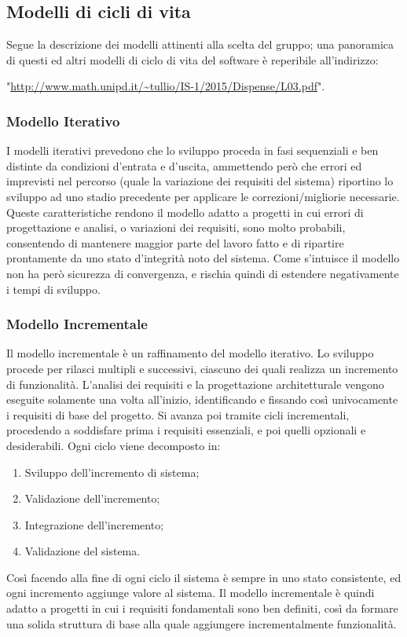\documentclass[a4paper,11pt]{article}
\begin{document}
	\subsection{Modelli di cicli di vita}
	Segue la descrizione dei modelli attinenti alla scelta del gruppo; una panoramica di questi ed altri modelli di ciclo di vita del software è reperibile all'indirizzo: 
	
	"\url{http://www.math.unipd.it/~tullio/IS-1/2015/Dispense/L03.pdf}".
	\subsubsection{Modello Iterativo}
	I modelli iterativi prevedono che lo sviluppo proceda in fasi sequenziali e ben distinte da condizioni d'entrata e d'uscita, ammettendo però che errori ed imprevisti nel percorso (quale la variazione dei requisiti del sistema) riportino lo sviluppo ad uno stadio precedente per applicare le correzioni/migliorie necessarie. Queste caratteristiche rendono il modello adatto a progetti in cui errori di progettazione e analisi, o variazioni dei requisiti, sono molto probabili, consentendo di mantenere maggior parte del lavoro fatto e di ripartire prontamente da uno stato d'integrità noto del sistema. Come s'intuisce il modello non ha però sicurezza di convergenza, e rischia quindi di estendere negativamente i tempi di sviluppo.
	\subsubsection{Modello Incrementale}
	Il modello incrementale è un raffinamento del modello iterativo. Lo sviluppo procede per rilasci multipli e successivi, ciascuno dei quali realizza un incremento di funzionalità. L'analisi dei requisiti e la progettazione architetturale vengono eseguite solamente una volta all'inizio, identificando e fissando così univocamente i requisiti di base del progetto. Si avanza poi tramite cicli incrementali, procedendo a soddisfare prima i requisiti essenziali, e poi quelli opzionali e desiderabili. Ogni ciclo viene decomposto in:
	\begin{enumerate}
	\item Sviluppo dell'incremento di sistema;
	\item Validazione dell'incremento;
	\item Integrazione dell'incremento;
	\item Validazione del sistema.
	\end{enumerate}
	Così facendo alla fine di ogni ciclo il sistema è sempre in uno stato consistente, ed ogni incremento aggiunge valore al sistema. Il modello incrementale è quindi adatto a progetti in cui i requisiti fondamentali sono ben definiti, così da formare una solida struttura di base alla quale aggiungere incrementalmente funzionalità.
\end{document}
